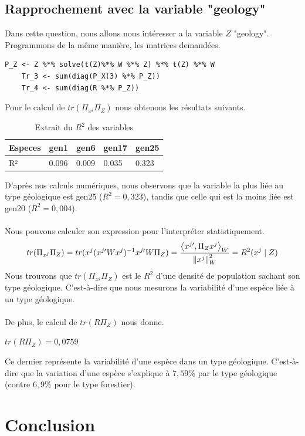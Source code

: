 \documentclass{article}
\begin{document}
\subsection{Rapprochement avec la variable "geology"}
Dans cette question, nous allons nous intéresser a la variable $Z$ "geology". Programmons de la même manière, les matrices demandées.
\begin{lstlisting}[caption=Extrait du code R, label= Question 1c]
    P_Z <- Z %*% solve(t(Z)%*% W %*% Z) %*% t(Z) %*% W
    Tr_3 <- sum(diag(P_X(3) %*% P_Z))
    Tr_4 <- sum(diag(R %*% P_Z))
\end{lstlisting}
Pour le calcul de $tr(\Pi_{x^j}\Pi_Z)$ nous obtenons les résultats suivants. 
\begin{table}[H]
    \centering
    \caption{Extrait du $R^2$ des variables}
    \begin{tabular}{|l|l|l|l|l|}
    \hline
    Especes & gen1  & gen6  & gen17 & gen25 \\ \hline
    R²      & 0.096 & 0.009 & 0.035 & 0.323 \\ \hline
    \end{tabular}
\end{table}
D'après nos calculs numériques, nous observons que la variable la plus liée au type géologique est gen25 ($R^2 = 0,323$), tandis que celle qui est la moins liée est gen20 ($R^2=0,004$).\\\\
Nous pouvons calculer son expression pour l'interpréter statistiquement.
\[
 tr(\Pi_{x^{j}}\Pi_Z) = tr(x^{j}(x^{j\prime}Wx^{j})^{-1}x^{j\prime}W\Pi_Z) = \frac{\left\langle x^{j\prime},\Pi_Zx^{j}\right\rangle_W }{\left\lVert x^j\right\rVert^2_W }\\= R^2(x^j\mid Z )
\]
Nous trouvons que $tr(\Pi_{x^{j}}\Pi_Z)$ est le $R^2$ d’une densité de
population sachant son type géologique. C’est-à-dire que nous mesurons la variabilité d’une espèce liée à un type géologique.\\\\
De plus, le calcul de $tr(R\Pi_Z)$ nous donne.
\begin{center}
    $tr(R\Pi_Z)=0,0759$
\end{center}
Ce dernier représente la variabilité d'une espèce dans un type géologique. C'est-à-dire que la variation
d'une espèce s'explique à $7,59\%$ par le type géologique (contre $6,9\%$ pour le type forestier).

\newpage
\section{Conclusion}
\end{document}
